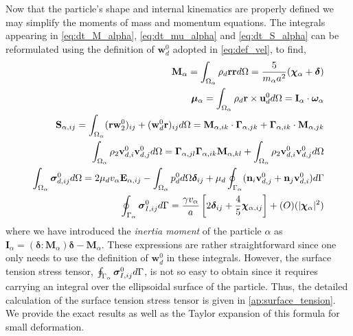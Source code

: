 Now that the particle's shape and internal kinematics are properly defined we may simplify the moments of mass and momentum equations. 
The integrals appearing in \ref{eq:dt_M_alpha}, \ref{eq:dt_mu_alpha} and \ref{eq:dt_S_alpha} can be reformulated using the definition of $\textbf{w}_d^0$ adopted in \ref{eq:def_vel}, to find, 
\begin{align}
    \textbf{M}_\alpha 
    = \intO{ \rho_d \textbf{rr} }
    = \frac{5}{m_\alpha a^2} (\bm\chi_\alpha+\bm\delta)\\
    \bm\mu_\alpha 
    = \intO{ \rho_d \textbf{r}\times\textbf{u}_d^0 }
    = \textbf{I}_\alpha \cdot \bm\omega_\alpha\\
    \textbf{S}_{\alpha,ij} = \intO{(\textbf{rw}_ 2^0 )_{ij}+ (\textbf{w}_d^0 \textbf{r})_{ij}} 
    = \textbf{M}_{\alpha,ik} \cdot \bm\Gamma_{\alpha,jk}
        +  \bm\Gamma_{\alpha,ik} \cdot \textbf{M}_{\alpha,jk}
    \\
    \intO{\rho_2 \textbf{v}_{d,i}^0\textbf{v}_{d,j}^0}
    = \bm\Gamma_{\alpha,jl}\bm\Gamma_{\alpha,ik} \textbf{M}_{\alpha,kl}  
    +\intO{\rho_2 \textbf{v}_{d,i}^0\textbf{v}_{d,j}^0}
    \label{eq:ww_def}
    \\
    \label{eq:sigma_d_def}
    \intO{\bm\sigma_{d,ij}^0}
    =
    2 \mu_d v_\alpha \textbf{E}_{\alpha,ij}
    - \intO{p_d^0} \bm\delta_{ij}
    + \mu_d \intS{(\textbf{n}_i \textbf{v}_{d,j}^0 + \textbf{n}_j \textbf{v}_{d,i}^0)}
    \\
    \intS{\bm\sigma_{I,ij}^0}
    = \frac{\gamma v_\alpha }{a} \left[
        2\bm\delta_{ij} 
        + \frac{4  }{5} \bm\chi_{\alpha,ij}
    \right]
    +\mathcal(O)(|\bm\chi_\alpha|^2)
\end{align}
where we have introduced the \textit{inertia moment} of the particle $\alpha$ as $\textbf{I}_\alpha = (\bm\delta : \textbf{M}_\alpha)\bm\delta - \textbf{M}_\alpha$. 
These expressions are rather straightforward since one only needs to use the definition of $\textbf{w}_d^0$ in these integrals. 
However, the surface tension stress tensor, $\oint_{\Gamma_{\alpha}} \bm\sigma_{I,ij}^0 d\Gamma$, is not so easy to obtain since it requires carrying an integral over the ellipsoidal surface of the particle.
Thus, the detailed calculation of the surface tension stress tensor is given in \ref{ap:surface_tension}. 
We provide the exact results as well as the Taylor expansion of this formula for small deformation. 

